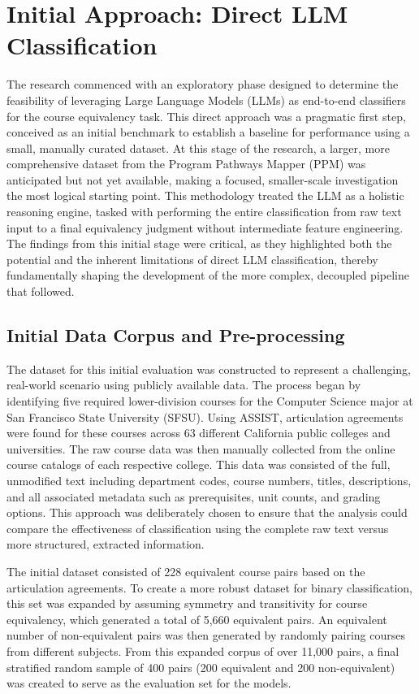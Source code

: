 \section{Initial Approach: Direct LLM Classification}\label{ch:3.1}
The research commenced with an exploratory phase designed to determine the feasibility of leveraging Large Language Models (LLMs) as end-to-end classifiers for the course equivalency task. This direct approach was a pragmatic first step, conceived as an initial benchmark to establish a baseline for performance using a small, manually curated dataset. At this stage of the research, a larger, more comprehensive dataset from the Program Pathways Mapper (PPM) was anticipated but not yet available, making a focused, smaller-scale investigation the most logical starting point. This methodology treated the LLM as a holistic reasoning engine, tasked with performing the entire classification from raw text input to a final equivalency judgment without intermediate feature engineering. The findings from this initial stage were critical, as they highlighted both the potential and the inherent limitations of direct LLM classification, thereby fundamentally shaping the development of the more complex, decoupled pipeline that followed.

\subsection{Initial Data Corpus and Pre-processing}
The dataset for this initial evaluation was constructed to represent a challenging, real-world scenario using publicly available data. The process began by identifying five required lower-division courses for the Computer Science major at San Francisco State University (SFSU). Using ASSIST, articulation agreements were found for these courses across 63 different California public colleges and universities. The raw course data was then manually collected from the online course catalogs of each respective college. This data was consisted of the full, unmodified text including department codes, course numbers, titles, descriptions, and all associated metadata such as prerequisites, unit counts, and grading options. This approach was deliberately chosen to ensure that the analysis could compare the effectiveness of classification using the complete raw text versus more structured, extracted information.

The initial dataset consisted of 228 equivalent course pairs based on the articulation agreements. To create a more robust dataset for binary classification, this set was expanded by assuming symmetry and transitivity for course equivalency, which generated a total of 5,660 equivalent pairs. An equivalent number of non-equivalent pairs was then generated by randomly pairing courses from different subjects. From this expanded corpus of over 11,000 pairs, a final stratified random sample of 400 pairs (200 equivalent and 200 non-equivalent) was created to serve as the evaluation set for the models.

